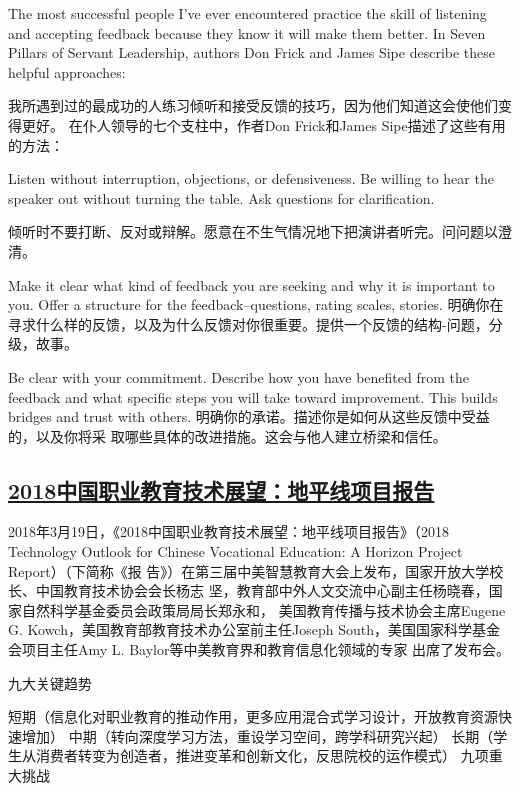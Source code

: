 \documentclass[11pt]{ctexart}
\begin{document}
{{{{The most successful people I've ever encountered practice the skill of listening
and accepting feedback because they know it will make them better. In Seven
Pillars of Servant Leadership, authors Don Frick and James Sipe describe these
helpful approaches:

我所遇到过的最成功的人练习倾听和接受反馈的技巧，因为他们知道这会使他们变得更好。
在仆人领导的七个支柱中，作者Don Frick和James Sipe描述了这些有用的方法：

Listen without interruption, objections, or defensiveness. Be willing to hear
the speaker out without turning the table. Ask questions for clarification.

倾听时不要打断、反对或辩解。愿意在不生气情况地下把演讲者听完。问问题以澄清。

Make it clear what kind of feedback you are seeking and why it is important to
you. Offer a structure for the feedback--questions, rating scales, stories.
 明确你在寻求什么样的反馈，以及为什么反馈对你很重要。提供一个反馈的结构-问题，分
级，故事。

Be clear with your commitment. Describe how you have benefited from the feedback
and what specific steps you will take toward improvement. This builds bridges
and trust with others.
明确你的承诺。描述你是如何从这些反馈中受益的，以及你将采
取哪些具体的改进措施。这会与他人建立桥梁和信任。


\subsection{\href{http://www.sohu.com/a/227957908\_200190?\_f=index\_chan25news\_124}{2018中国职业教育技术展望：地平线项目报告}}
\label{sec:org8c85674}

2018年3月19日，《2018中国职业教育技术展望：地平线项目报告》（2018 Technology
Outlook for Chinese Vocational Education: A Horizon Project Report）（下简称《报
告》）在第三届中美智慧教育大会上发布，国家开放大学校长、中国教育技术协会会长杨志
坚，教育部中外人文交流中心副主任杨晓春，国家自然科学基金委员会政策局局长郑永和，
美国教育传播与技术协会主席Eugene G. Kowch，美国教育部教育技术办公室前主任Joseph
South，美国国家科学基金会项目主任Amy L. Baylor等中美教育界和教育信息化领域的专家
出席了发布会。

九大关键趋势

短期（信息化对职业教育的推动作用，更多应用混合式学习设计，开放教育资源快速增加）
中期（转向深度学习方法，重设学习空间，跨学科研究兴起）
长期（学生从消费者转变为创造者，推进变革和创新文化，反思院校的运作模式）
九项重大挑战

}}}}
\end{document}
